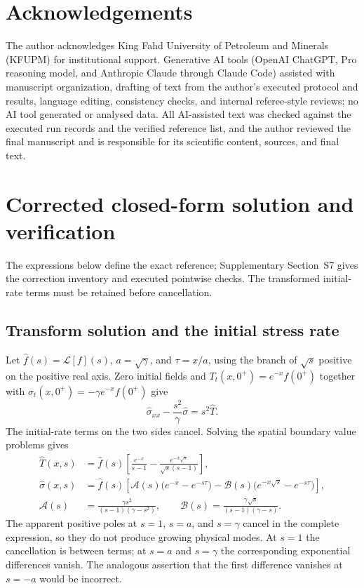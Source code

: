 \documentclass[11pt]{article}
\begin{document}
\section*{Acknowledgements}
The author acknowledges King Fahd University of Petroleum and Minerals
(KFUPM) for institutional support. Generative AI tools (OpenAI ChatGPT,
Pro reasoning model, and Anthropic Claude through Claude Code) assisted with
manuscript organization, drafting of text from the author's executed
protocol and results, language editing, consistency checks, and internal
referee-style reviews; no AI tool generated or analysed data. All AI-assisted
text was checked against the executed run records and the verified reference
list, and the author reviewed the final manuscript and is responsible for its
scientific content, sources, and final text.

\appendix
\section{Corrected closed-form solution and verification}
\label{app:exact}

The expressions below define the exact reference; Supplementary
Section~S7 gives the correction inventory and executed pointwise checks.
The transformed initial-rate terms must be retained before cancellation.

\subsection{Transform solution and the initial stress rate}

Let $\widehat f(s)=\mathcal L[f](s)$, $a=\sqrt\gamma$, and
$\tau=x/a$, using the branch of $\sqrt s$ positive on the positive real axis.
Zero initial fields and
$T_t(x,0^+)=e^{-x}f(0^+)$ together with
$\sigma_t(x,0^+)=-\gamma e^{-x}f(0^+)$ give
\begin{equation}
 \widehat\sigma_{xx}-\frac{s^2}{\gamma}\widehat\sigma
 =s^2\widehat T.
\end{equation}
The initial-rate terms on the two sides cancel. Solving the spatial boundary
value problems gives
\begin{align}
 \widehat T(x,s)
 &=\widehat f(s)\left[
 \frac{e^{-x}}{s-1}-\frac{e^{-x\sqrt s}}{\sqrt s(s-1)}\right],\\
 \widehat\sigma(x,s)
 &=\widehat f(s)\left[
 \mathcal{A}(s)\bigl(e^{-x}-e^{-s\tau}\bigr)
 -\mathcal{B}(s)\bigl(e^{-x\sqrt s}-e^{-s\tau}\bigr)\right],\\
 \mathcal{A}(s)&=\frac{\gamma s^2}{(s-1)(\gamma-s^2)},\qquad
 \mathcal{B}(s)=\frac{\gamma\sqrt s}{(s-1)(\gamma-s)}.
\end{align}
The apparent positive poles at $s=1$, $s=a$, and $s=\gamma$ cancel in
the complete expression, so they do not produce growing physical modes.
At $s=1$ the cancellation is between terms; at $s=a$ and $s=\gamma$
the corresponding exponential differences vanish. The analogous assertion
that the first difference vanishes at $s=-a$ would be incorrect.
\end{document}
